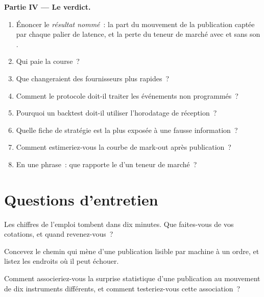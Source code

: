 \begin{problem}
\medskip\noindent\textbf{Partie IV --- Le verdict.}
\begin{enumerate}[resume]
\item Énoncer le \emph{résultat nommé}~: la part du mouvement de la publication captée par chaque palier de latence, et la perte du teneur de marché avec et sans
son .
\item Qui paie la course~?
\item Que changeraient des fournisseurs plus rapides~?
\item Comment le protocole doit-il traiter les événements non programmés~?
\item Pourquoi un backtest doit-il utiliser l'horodatage de réception~?
\item Quelle fiche de stratégie est la plus exposée à une fausse information~?
\item Comment estimeriez-vous la courbe de mark-out après publication~?
\item En une phrase~: que rapporte le  d'un teneur de marché~?
\end{enumerate}
\end{problem}

\section{Questions d'entretien}

\begin{interviewq}\label{iq:hf:news-and-event-trading:1}
Les chiffres de l'emploi tombent dans dix minutes. Que faites-vous de vos cotations, et quand revenez-vous~?
\end{interviewq}

\begin{interviewq}\label{iq:hf:news-and-event-trading:2}
Concevez le chemin qui mène d'une publication lisible par machine à un ordre, et listez les endroits où il peut échouer.
\end{interviewq}

\begin{interviewq}\label{iq:hf:news-and-event-trading:3}
Comment associeriez-vous la surprise statistique d'une publication au mouvement de dix instruments différents, et comment testeriez-vous cette association~?
\end{interviewq}

